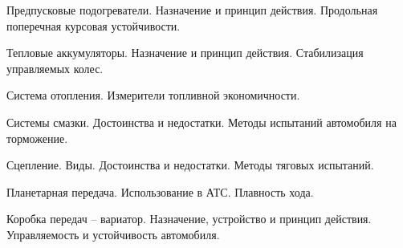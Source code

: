 \documentclass[
	14pt,
	a4paper,
	]
	{scrartcl}
\begin{document}
\vfill

\newpage


\shapk
{}
\setcounter{zad}{0}

\vfill
\z Предпусковые подогреватели. Назначение и принцип действия.
 \vfill
\z Продольная поперечная курсовая устойчивости.
 \vfill

\vfill

\newpage


\shapk
{}
\setcounter{zad}{0}

\vfill
\z Тепловые аккумуляторы. Назначение и принцип действия.
 \vfill
\z Стабилизация управляемых колес.
 \vfill

\vfill

\newpage


\shapk
{}
\setcounter{zad}{0}

\vfill
\z Система отопления.
 \vfill
\z Измерители топливной экономичности.
 \vfill

\vfill

\newpage


\shapk
{}
\setcounter{zad}{0}

\vfill
\z Системы смазки. Достоинства и недостатки.
 \vfill
\z Методы испытаний автомобиля на торможение.
 \vfill

\vfill

\newpage


\shapk
{}
\setcounter{zad}{0}

\vfill
\z Сцепление. Виды. Достоинства и недостатки.
 \vfill
\z Методы тяговых испытаний.
 \vfill

\vfill

\newpage


\shapk
{}
\setcounter{zad}{0}

\vfill
\z Планетарная передача. Использование в АТС.
 \vfill
\z Плавность хода.
 \vfill

\vfill

\newpage


\shapk
{}
\setcounter{zad}{0}

\vfill
\z Коробка передач – вариатор. Назначение, устройство и принцип действия.
 \vfill
\z Управляемость и устойчивость автомобиля.
 \vfill

\vfill

\newpage


\shapk
{}
\setcounter{zad}{0}
\end{document}
